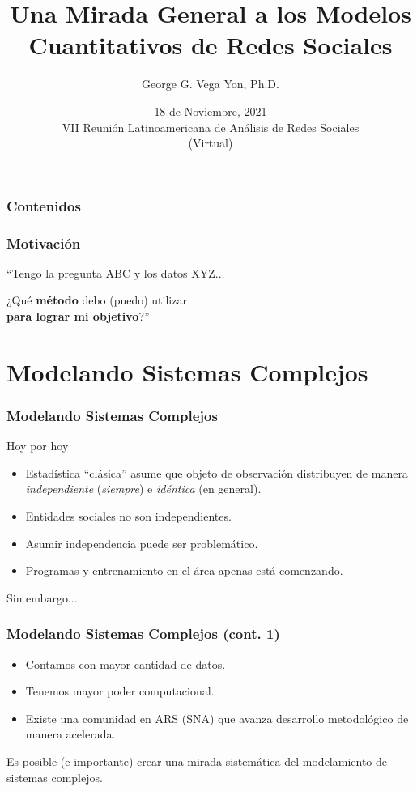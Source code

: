 \documentclass[aspectratio=169]{beamer}
\title[Modelos Cuant. de Redes Sociales]{Una Mirada General a los Modelos Cuantitativos de Redes Sociales}
\author[ggvy.cl]{George G. Vega Yon, Ph.D.}
\date{18 de Noviembre, 2021\\VII Reunión Latinoamericana de Análisis de Redes Sociales\\(Virtual)}
\institute[UofU Epi]{Division of Epidemiology\\University of Utah}
\begin{document}

\begin{frame}
	\frametitle{Contenidos}
\tableofcontents
\end{frame}

\begin{frame}
	\frametitle{Motivación}
	``Tengo la pregunta ABC y los datos XYZ...\pause \bigskip
	\hfill\begin{minipage}{.8\linewidth}
		\raggedleft
		\Large ¿Qué \textbf{método} debo (puedo) utilizar\\\textbf{para lograr mi objetivo}?''
	\end{minipage}
\end{frame}

\section{Modelando Sistemas Complejos}


\begin{frame}
	\frametitle{Modelando Sistemas Complejos}
	Hoy por hoy
	\pause
	\begin{itemize}
		\item Estadística ``clásica'' asume que objeto de observación distribuyen de manera \textit{independiente} (\textit{siempre}) e \textit{idéntica}\pause{} (en general).\pause
		\item Entidades sociales no son independientes.\pause
		\item Asumir independencia puede ser problemático.\pause
		\item Programas y entrenamiento en el área apenas está comenzando.
	\end{itemize}\pause
	\vfill\hfill Sin embargo...
	\end{frame}

\begin{frame}
	\frametitle{Modelando Sistemas Complejos (cont. 1)}
	\begin{itemize}
		\item Contamos con mayor cantidad de datos.\pause
		\item Tenemos mayor poder computacional.\pause
		\item Existe una comunidad en ARS (SNA) que avanza desarrollo metodológico de manera acelerada.\pause
\end{itemize}

\vfill\hfill\large Es posible (e importante) crear una mirada sistemática del modelamiento de sistemas complejos.

\end{frame}
\end{document}
